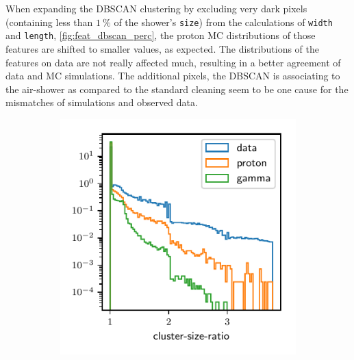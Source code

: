 When expanding the DBSCAN clustering by excluding very dark pixels (containing less than $\SI{1}{\percent}$ of the shower's \texttt{size}) from the
calculations of \texttt{width} and \texttt{length},
\autoref{fig:feat_dbscan_perc}, the proton MC distributions of those features
are shifted to smaller values, as expected. The distributions of the features
on data are not really affected much, resulting in a better agreement of data
and MC simulations. The additional pixels, the DBSCAN is associating to the air-shower as compared to the standard cleaning seem to be one cause for the mismatches of simulations and observed data.
%
\begin{figure}
  \begin{subfigure}{0.5\textwidth}
    \centering
    \includegraphics[width=\textwidth, page=23]{Plots/data_mc/features_DBSCAN.pdf}
  \end{subfigure}
  \begin{subfigure}{0.5\textwidth}
    \centering

\end{subfigure}
\end{figure}
